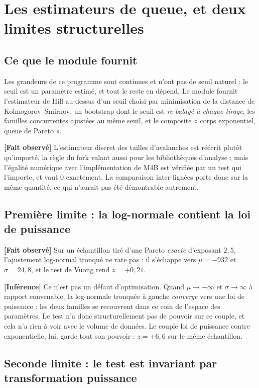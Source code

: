\documentclass[11pt,a4paper]{article}
\newcommand{\fait}{\textbf{[Fait observé]}}
\newcommand{\inference}{\textbf{[Inférence]}}
\begin{document}
\section{Les estimateurs de queue, et deux limites structurelles}

\subsection{Ce que le module fournit}

Les grandeurs de ce programme sont continues et n'ont pas de seuil naturel :
le seuil est un paramètre estimé, et tout le reste en dépend. Le module
fournit l'estimateur de Hill au-dessus d'un seuil choisi par minimisation de
la distance de Kolmogorov--Smirnov, un bootstrap dont le seuil est
\emph{re-balayé à chaque tirage}, les familles concurrentes ajustées au même
seuil, et le composite « corps exponentiel, queue de Pareto ».

\fait{} L'estimateur discret des tailles d'avalanches est réécrit plutôt
qu'importé, la règle du fork valant aussi pour les bibliothèques d'analyse ;
mais l'égalité numérique avec l'implémentation de M4B est vérifiée par un
test qui l'importe, et vaut $0$ exactement. La comparaison inter-lignées
porte donc sur la même quantité, ce qui n'aurait pas été démontrable
autrement.

\subsection{Première limite : la log-normale contient la loi de puissance}

\fait{} Sur un échantillon tiré d'une Pareto \emph{exacte} d'exposant
$2{,}5$, l'ajustement log-normal tronqué ne rate pas : il s'échappe vers
$\mu = -932$ et $\sigma = 24{,}8$, et le test de Vuong rend $z = +0{,}21$.

\inference{} Ce n'est pas un défaut d'optimisation. Quand $\mu \to -\infty$
et $\sigma \to \infty$ à rapport convenable, la log-normale tronquée à gauche
\emph{converge} vers une loi de puissance : les deux familles se recouvrent
dans ce coin de l'espace des paramètres. Le test n'a donc structurellement
pas de pouvoir sur ce couple, et cela n'a rien à voir avec le volume de
données. Le couple loi de puissance contre exponentielle, lui, garde tout son
pouvoir : $z = +6{,}6$ sur le même échantillon.

\subsection{Seconde limite : le test est invariant par transformation puissance}
\end{document}

